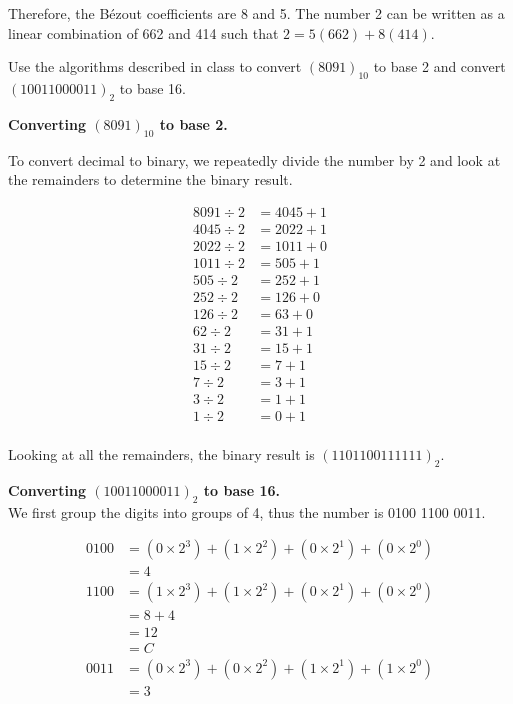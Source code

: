 \documentclass[12pt]{article}
\newenvironment{exercise}[2][Exercise]{\begin{trivlist}
\item[\hskip \labelsep {\bfseries #1}\hskip \labelsep {\bfseries #2.}]}{\end{trivlist}}
\begin{document}
Therefore, the B\'ezout coefficients are 8 and 5. The number 2 can be written as a linear combination of 662 and 414 such that $2 = 5(662) + 8(414)$.

\pagebreak

\begin{exercise}{3a}
Use the algorithms described in class to convert $(8091)_{10}$ to base 2 and convert $(100 1100 0011)_2$ to base 16.
\end{exercise}

\textbf{Converting $(8091)_{10}$ to base 2.\\}

To convert decimal to binary, we repeatedly divide the number by 2 and look at the remainders to determine the binary result.

\begin{align*}
8091 \div 2 &= 4045 + 1 \\
4045 \div 2 &= 2022 + 1 \\
2022 \div 2 &= 1011 + 0 \\
1011 \div 2 &= 505 + 1 \\
505 \div 2 &= 252 + 1 \\
252 \div 2 &= 126 + 0 \\
126 \div 2 &= 63 + 0 \\
62 \div 2 &= 31 + 1 \\
31 \div 2 &= 15 + 1 \\
15 \div 2 &= 7 + 1 \\
7 \div 2 &= 3 + 1 \\
3 \div 2 &= 1 + 1 \\
1 \div 2 &= 0 + 1 \\
\end{align*}

Looking at all the remainders, the binary result is $(1101100111111)_2$.

\textbf{Converting $(100 1100 0011)_2$ to base 16.\\}
We first group the digits into groups of 4, thus the number is 0100 1100 0011.

\begin{align*}
0100 &= (0\times2^3) + (1\times2^2) + (0\times2^1) + (0\times2^0) \\
&= 4 \\
1100 &= (1 \times 2^3) + (1 \times 2^2)+ (0\times2^1)+ (0\times2^0) \\
&= 8+4 \\
&= 12 \\
&= C \\
0011 &= (0 \times 2^3) + (0 \times 2^2) + (1\times2^1) + (1\times2^0) \\
&= 3 \\
\end{align*}
\end{document}
